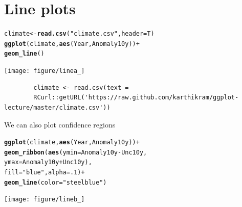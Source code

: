\documentclass{beamer}\usepackage{graphicx, color}
\makeatletter
\newcommand{\hlfunctioncall}[1]{\textcolor[rgb]{0.501960784313725,0,0.329411764705882}{\textbf{#1}}}%
\newcommand{\hlstring}[1]{\textcolor[rgb]{0.6,0.6,1}{#1}}%
\newenvironment{kframe}{%
 \def\at@end@of@kframe{}%
 \ifinner\ifhmode%
  \def\at@end@of@kframe{\end{minipage}}%
  \begin{minipage}{\columnwidth}%
 \fi\fi%
 \def\FrameCommand##1{\hskip\@totalleftmargin \hskip-\fboxsep
 \colorbox{shadecolor}{##1}\hskip-\fboxsep
     \hskip-\linewidth \hskip-\@totalleftmargin \hskip\columnwidth}%
 \MakeFramed {\advance\hsize-\width
   \@totalleftmargin\z@ \linewidth\hsize
   \@setminipage}}%
 {\par\unskip\endMakeFramed%
 \at@end@of@kframe}
\newenvironment{knitrout}{}{} %
\makeatother
\begin{document}
\section*{Line plots}
\frame{\sectionpage}

\begin{frame}[fragile]


\begin{knitrout}\footnotesize
{}\color{fgcolor}\begin{kframe}
\begin{alltt}
climate <- \hlfunctioncall{read.csv}(\hlstring{"climate.csv"}, header = T)
\hlfunctioncall{ggplot}(climate, \hlfunctioncall{aes}(Year, Anomaly10y)) +
\hlfunctioncall{geom_line}()
\end{alltt}
\end{kframe}
\texttt{[image: figure/linea\_]} 

\end{knitrout}

\begin{flushright}
\begingroup
    \fontsize{6pt}{12pt}\selectfont
    \begin{verbatim}
        climate <- read.csv(text =
        RCurl::getURL('https://raw.github.com/karthikram/ggplot-lecture/master/climate.csv'))
    \end{verbatim}
\endgroup
\end{flushright}
\end{frame}

\begin{frame}[fragile]
We can also plot confidence regions
\begin{knitrout}\footnotesize
{}\color{fgcolor}\begin{kframe}
\begin{alltt}
\hlfunctioncall{ggplot}(climate, \hlfunctioncall{aes}(Year, Anomaly10y)) +
\hlfunctioncall{geom_ribbon}(\hlfunctioncall{aes}(ymin = Anomaly10y - Unc10y,
ymax = Anomaly10y + Unc10y),
fill = \hlstring{"blue"}, alpha = .1) +
\hlfunctioncall{geom_line}(color = \hlstring{"steelblue"})
\end{alltt}
\end{kframe}
\texttt{[image: figure/lineb\_]} 

\end{knitrout}

\end{frame}
\end{document}
